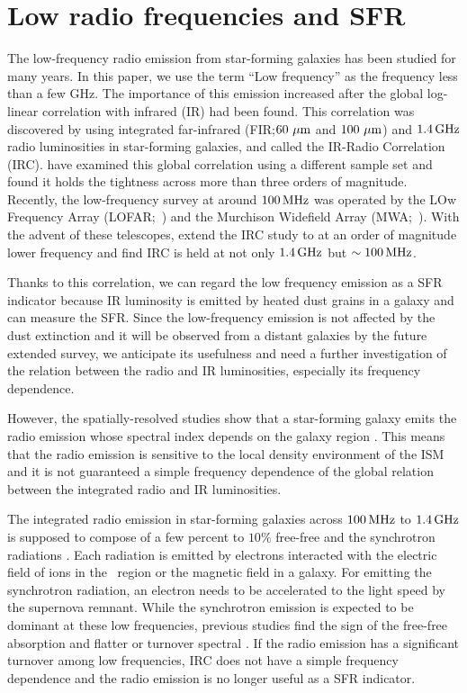 \section{Low radio frequencies and SFR}

The low-frequency radio emission from star-forming galaxies has been studied for many years.
In this paper, we use the term ``Low frequency'' as the frequency less than a few GHz.
The importance of this emission increased after the global log-linear correlation with infrared (IR) had been found.
This correlation was discovered by \citet{Helou1985} using integrated far-infrared (FIR;\@$60\,\,\mathrm{\mu m}$ and $100\,\,\mathrm{\mu m}$) and $1.4\,\mathrm{GHz}$ radio luminosities in star-forming galaxies, and called the IR-Radio Correlation (IRC).
\citet{Condon1991a,Yun2001a, Bell2003} have examined this global correlation using a different sample set and found it holds the tightness across more than three orders of magnitude.
Recently, the low-frequency survey at around $100\,\mathrm{MHz}$ was operated by the LOw Frequency Array (LOFAR;~\citealt{VanHaarlem2013}) and the Murchison Widefield Array (MWA;~\citealt{Tingay2013a}).
With the advent of these telescopes, \citet{CalistroRivera2017a, Read2018, Wang2019} extend the IRC study to at an order of magnitude lower frequency and find IRC is held at not only $1.4\,\mathrm{GHz}$ but $\sim 100\,\mathrm{MHz}$.

Thanks to this correlation, we can regard the low frequency emission as a SFR indicator because IR luminosity is emitted by heated dust grains in a galaxy and can measure the SFR\@.
Since the low-frequency emission is not affected by the dust extinction \citep{Yun2001a, Murphy2011} and it will be observed from a distant galaxies by the future extended survey, we anticipate its usefulness and need a further investigation of the relation between the radio and IR luminosities, especially its frequency dependence.

However, the spatially-resolved studies show that a star-forming galaxy emits the radio emission whose spectral index depends on the galaxy region \citep{Kapinska2017a, For2018a, Heesen2019}.
This means that the radio emission is sensitive to the local density environment of the ISM and it is not guaranteed a simple frequency dependence of the global relation between the integrated radio and IR luminosities.

The integrated radio emission in star-forming galaxies across $100\,\mathrm{MHz}$ to $1.4\,\mathrm{GHz}$ is supposed to compose of a few percent to $10\%$ free-free and the synchrotron radiations \citep{Condon1992a}.
Each radiation is emitted by electrons interacted with the electric field of ions in the \ih~region or the magnetic field in a galaxy.
For emitting the synchrotron radiation, an electron needs to be accelerated to the light speed by the supernova remnant.
While the synchrotron emission is expected to be dominant at these low frequencies, previous studies find the sign of the free-free absorption and flatter or turnover spectral \citep{Schober2017, Chyzy2018}.
If the radio emission has a significant turnover among low frequencies, IRC does not have a simple frequency dependence and the radio emission is no longer useful as a SFR indicator.

